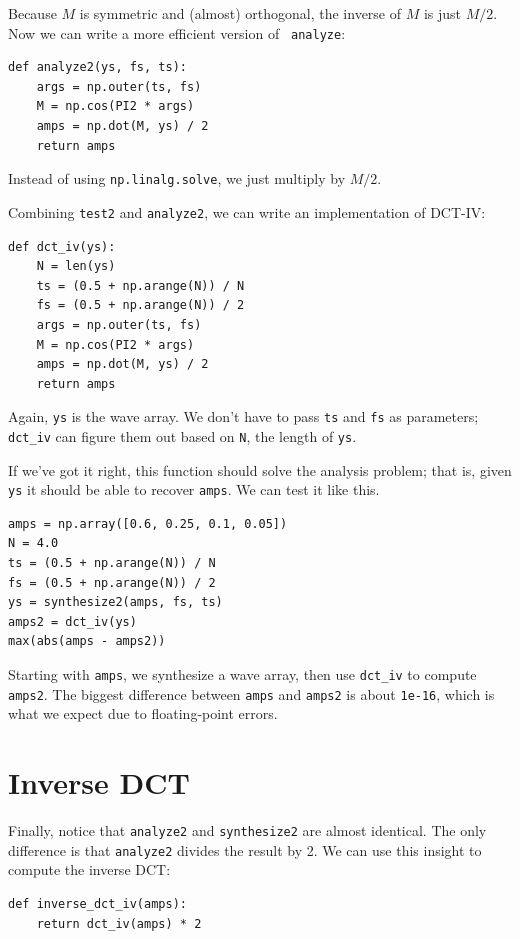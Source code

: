 \documentclass[12pt]{book}
\begin{document}
Because $M$ is symmetric and (almost) orthogonal, the inverse of $M$
is just $M/2$.  Now we can write a more efficient version of {\tt
  analyze}:

\begin{verbatim}
def analyze2(ys, fs, ts):
    args = np.outer(ts, fs)
    M = np.cos(PI2 * args)
    amps = np.dot(M, ys) / 2
    return amps
\end{verbatim}

Instead of using {\tt np.linalg.solve}, we just multiply
by $M/2$.

Combining {\tt test2} and {\tt analyze2}, we can write an
implementation of DCT-IV:

\begin{verbatim}
def dct_iv(ys):
    N = len(ys)
    ts = (0.5 + np.arange(N)) / N
    fs = (0.5 + np.arange(N)) / 2
    args = np.outer(ts, fs)
    M = np.cos(PI2 * args)
    amps = np.dot(M, ys) / 2
    return amps
\end{verbatim}

Again, {\tt ys} is the wave array.  We don't have to pass
{\tt ts} and {\tt fs} as parameters; \verb"dct_iv" can
figure them out based on {\tt N}, the length of {\tt ys}.

If we've got it right, this function should solve the analysis
problem; that is, given {\tt ys} it should be able to recover
{\tt amps}.  We can test it like this.

\begin{verbatim}
amps = np.array([0.6, 0.25, 0.1, 0.05])
N = 4.0
ts = (0.5 + np.arange(N)) / N
fs = (0.5 + np.arange(N)) / 2
ys = synthesize2(amps, fs, ts)
amps2 = dct_iv(ys)
max(abs(amps - amps2))
\end{verbatim}

Starting with {\tt amps}, we synthesize a wave array, then use
\verb"dct_iv" to compute {\tt amps2}.  The biggest
difference between {\tt amps} and {\tt amps2} is about {\tt 1e-16},
which is what we expect due to floating-point errors.


\section{Inverse DCT}

Finally, notice that {\tt analyze2} and {\tt synthesize2} are almost
identical.  The only difference is that {\tt analyze2} divides the
result by 2.  We can use this insight to compute the inverse DCT:

\begin{verbatim}
def inverse_dct_iv(amps):
    return dct_iv(amps) * 2
\end{verbatim}
\end{document}
